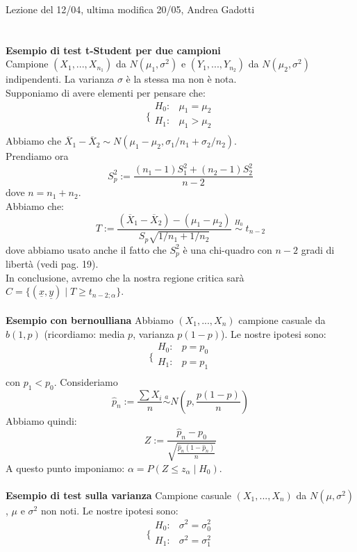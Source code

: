 Lezione del 12/04, ultima modifica 20/05, Andrea Gadotti\\
\\
\\

\textbf{Esempio di test t-Student per due campioni}\\
Campione $(X_1,...,X_{n_1})$ da $N(\mu_1,\sigma^2)$ e $(Y_1,...,Y_{n_2})$ da $N(\mu_2,\sigma^2)$ indipendenti. La varianza $\sigma$ è la stessa ma non è nota.\\
Supponiamo di avere elementi per pensare che:
$$\bigg \{
\begin{array}{rl}
H_0: & \mu_1=\mu_2 \\
H_1: & \mu_1>\mu_2 \\
\end{array}
$$
Abbiamo che $\overline{X}_1 - \overline{X}_2 \sim N(\mu_1 - \mu_2, \sigma_1/n_1 + \sigma_2/n_2)$.\\
Prendiamo ora 
$$S_p^2:= \frac{(n_1-1)S_1^2 + (n_2-1)S_2^2}{n-2}$$ 
dove $n=n_1+n_2$.\\
Abbiamo che:
$$T:= \frac{(\overline{X}_1 - \overline{X}_2)-(\mu_1-\mu_2)}{S_p \sqrt{1/n_1+1/n_2}} \; \stackrel{H_0}{\sim} \; t_{n-2}$$
dove abbiamo usato anche il fatto che $S_p^2$ è una chi-quadro con $n-2$ gradi di libertà (vedi pag. 19).\\
In conclusione, avremo che la nostra regione critica sarà $C=\lbrace (\underline{x},\underline{y}) \mid T \geq t_{n-2;\alpha} \rbrace$.\\
\\
\textbf{Esempio con bernoulliana} Abbiamo $(X_1,...,X_n)$ campione casuale da $b(1,p)$ (ricordiamo: media $p$, varianza $p(1-p)$). Le nostre ipotesi sono:
$$\bigg \{
\begin{array}{rl}
H_0: & p=p_0 \\
H_1: & p=p_1 \\
\end{array}
$$
con $p_1<p_0$. Consideriamo
$$\hat{p}_n := \frac{\sum X_i}{n} \stackrel{a}{\sim} N \left( p, \frac{p(1-p)}{n} \right)$$
Abbiamo quindi:
$$Z:= \frac{\hat{p}_n-p_0}{\sqrt{\frac{\hat{p}_n (1-\hat{p}_n)}{n}}}$$
A questo punto imponiamo: $\alpha = P(Z \leq z_{\alpha} \mid H_0)$.\\
\\
\textbf{Esempio di test sulla varianza} Campione casuale $(X_1,...,X_n)$ da $N(\mu,\sigma^2)$, $\mu$ e $\sigma^2$ non noti. Le nostre ipotesi sono: 
$$\bigg \{
\begin{array}{rl}
H_0: & \sigma^2=\sigma_0^2 \\
H_1: & \sigma^2=\sigma_1^2 \\
\end{array}
$$
